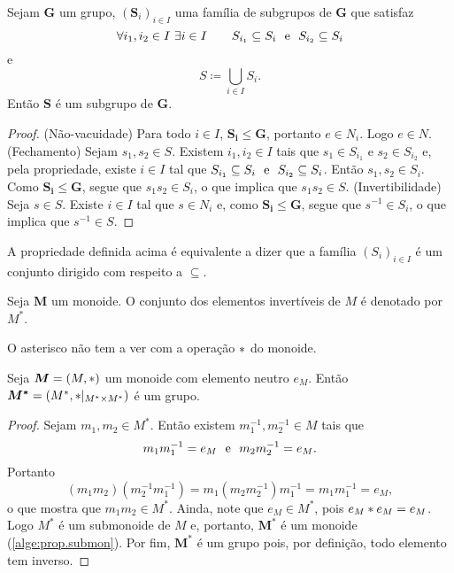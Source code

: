 \begin{prop}
\label{alge:prop.subgru.uni}
Sejam $\bm G$ um grupo, $(\bm S_i)_{i \in I}$ uma família de subgrupos de $\bm G$ que satisfaz
	\begin{equation*}
	\forall i_1,i_2 \in I\ \exists i \in I \qquad S_{i_1} \subseteq S_{i} \text{\ \ e\ \ } S_{i_2} \subseteq S_{i}
	\end{equation*}
e
	\begin{equation*}
	S \coloneqq \bigcup_{i \in I} S_i.
	\end{equation*}
Então $\bm S$ é um subgrupo de $\bm G$.
\end{prop}
\begin{proof}
(Não-vacuidade) Para todo $i \in I$, $\bm{S_i}\leq \bm G$, portanto $e \in N_i$. Logo $e \in N$. (Fechamento) Sejam $s_1,s_2 \in S$. Existem $i_1,i_2 \in I$ tais que $s_1 \in S_{i_1}$ e $s_2 \in S_{i_2}$ e, pela propriedade, existe $i \in I$ tal que $S_{i_1} \subseteq S_{i} \text{\ \ e\ \ } S_{i_2} \subseteq S_{i}$. Então $s_1,s_2 \in S_i$. Como $\bm{S_i} \leq \bm G$, segue que $s_1s_2 \in S_i$, o que implica que $s_1s_2 \in S$. (Invertibilidade) Seja $s \in S$. Existe $i \in I$ tal que $s \in N_i$ e, como $\bm{S_i} \leq \bm G$, segue que $s^{-1} \in S_i$, o que implica que $s^{-1} \in S$.
\end{proof}

A propriedade definida acima é equivalente a dizer que a família $(S_i)_{i \in I}$ é um conjunto dirigido com respeito a $\subseteq$.

\begin{defi}
	Seja $\bm M$ um monoide. O conjunto dos elementos invertíveis de $M$ é denotado por $M^*$.
\end{defi}

	O asterisco não tem a ver com a operação $\ast$ do monoide.

\begin{prop}
	Seja $\bm M = (M,\ast)$ um monoide com elemento neutro $e_M$. Então $\bm{M^*}=(M^*,\ast|_{M^* \times M^*})$ é um grupo.
\end{prop}
\begin{proof}
	Sejam $m_1,m_2 \in M^*$. Então existem $m_1^{-1},m_2^{-1} \in M$ tais que
	\begin{equation*}
	m_1m_1^{-1}=e_M \text{\ \ e\ \ } m_2m_2^{-1}=e_M.
	\end{equation*}
Portanto
	\begin{equation*}
	(m_1m_2)(m_2^{-1}m_1^{-1}) = m_1(m_2m_2^{-1})m_1^{-1} = m_1m_1^{-1} = e_M,
	\end{equation*}
o que mostra que $m_1m_2 \in M^*$. Ainda, note que $e_M \in M^*$, pois $e_M \ast e_M = e_M$. Logo $M^*$ é um submonoide de $M$ e, portanto, $\bm{M^*}$ é um monoide (\ref{alge:prop.submon}). Por fim, $\bm{M^*}$ é um grupo pois, por definição, todo elemento tem inverso.
\end{proof}

